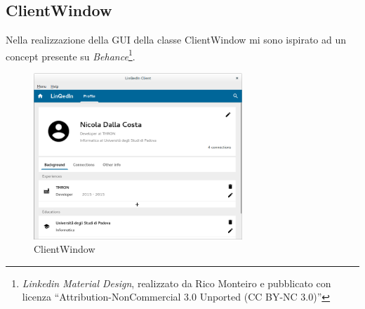 \documentclass[a4paper]{article}
\begin{document}
\subsection*{ClientWindow}
Nella realizzazione della GUI della classe ClientWindow mi sono ispirato ad un concept presente su \textit{Behance}\footnote{\textit{Linkedin Material Design}, realizzato da Rico Monteiro e pubblicato con licenza ``Attribution-NonCommercial 3.0 Unported (CC BY-NC 3.0)''}.

\begin{figure}[!ht]
\centering
\caption{ClientWindow}
\includegraphics[width=0.7\textwidth]{ClientWindow.png}
\end{figure}
\end{document}
